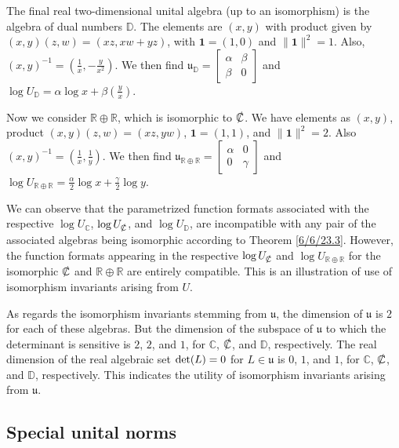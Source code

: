 \documentclass{amsart}
\numberwithin{equation}{section}
\theoremstyle{definition}
\numberwithin{theorem}{section}
\begin{document}
The final real two-dimensional unital algebra (up to an isomorphism) is the algebra of dual numbers $\mathbb{D}$.  The elements are $(x,y)$ with product given by $(x,y)(z,w) = (xz,xw+yz)$, with $\mathbf{1}=(1,0)$ and $\|\mathbf{1}\|^2 = 1$. Also, $(x,y)^{-1} = (\frac{1}{x},-\frac{y}{x^2})$.  We then find $\mathfrak{u}_\mathbb{D} = \left[\begin{array}{ccc}
 \alpha & \beta   \\ 
 \beta & 0    
\end{array}\right]$ and $\log  U_{\mathbb{D}} = \alpha\log x + \beta\left(\frac{y}{x}\right)$.

Now we consider $\mathbb{R}\oplus\mathbb{R}$, which is isomorphic to $\slashed{\mathbb{C}}$.  We have elements as $(x,y)$, product $(x,y)(z,w) = (xz,yw)$, $\mathbf{1}=(1,1)$, and $\|\mathbf{1}\|^2 = 2$.  Also $(x,y)^{-1} = (\frac{1}{x},\frac{1}{y})$.  We then find $\mathfrak{u}_{\mathbb{R}\oplus\mathbb{R}} = \left[\begin{array}{ccc}
 \alpha & 0   \\ 
 0 & \gamma    
\end{array}\right]$ and $\log  U_{\mathbb{R}\oplus\mathbb{R}} = \frac{\alpha}{2}\log x + \frac{\gamma}{2}\log y$.

We can observe that the parametrized function formats associated with the respective $\log U_{\mathbb{C}}$, $\log U_{\slashed{\mathbb{C}}}$, and $\log U_{\mathbb{D}}$, are incompatible with any pair of the associated algebras being isomorphic according to Theorem \ref{6/6/23.3}.  However, the function formats appearing in the respective $\log U_{\slashed{\mathbb{C}}}$ and $\log U_{\mathbb{R}\oplus\mathbb{R}}$  for the isomorphic $\slashed{\mathbb{C}}$ and $\mathbb{R}\oplus\mathbb{R}$ are entirely compatible.  This is an illustration of use of isomorphism invariants arising from $U$.

  As regards the isomorphism invariants stemming from $\mathfrak{u}$, the dimension of $\mathfrak{u}$ is $2$ for each of these algebras.  But the dimension of the subspace of $\mathfrak{u}$ to which the determinant is sensitive is $2$, $2$, and $1$, for $\mathbb{C}$, $\slashed{\mathbb{C}}$, and $\mathbb{D}$, respectively.  The real dimension of the real algebraic set ${\rm det}(L) = 0$ for $L\in\mathfrak{u}$ is $0$, $1$, and $1$, for $\mathbb{C}$, $\slashed{\mathbb{C}}$, and $\mathbb{D}$, respectively.  This indicates the utility of isomorphism invariants arising from $\mathfrak{u}$. 

\subsection{Special unital norms}
\end{document}
